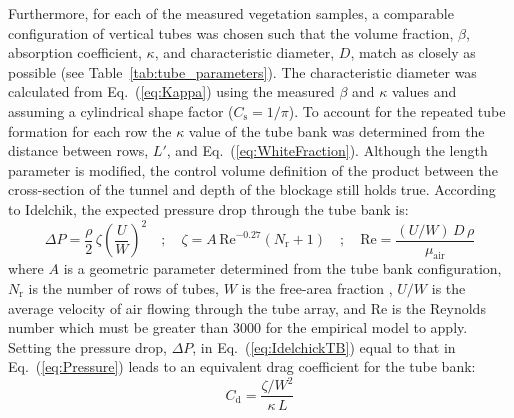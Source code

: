 \documentclass[12pt]{article}
\begin{document}
Furthermore, for each of the measured vegetation samples, a comparable configuration of vertical tubes was chosen such that the volume fraction, $\beta$, absorption coefficient, $\kappa$, and characteristic diameter, $D$, match as closely as possible (see Table~\ref{tab:tube_parameters}). The characteristic diameter was calculated from Eq.~(\ref{eq:Kappa}) using the measured $\beta$ and $\kappa$ values and assuming a cylindrical shape factor ($C_{\mathrm{s}} = 1/\pi$). To account for the repeated tube formation for each row the $\kappa$ value of the tube bank was determined from the distance between rows, $L'$, and Eq.~(\ref{eq:WhiteFraction}). Although the length parameter is modified, the control volume definition of the product between the cross-section of the tunnel and depth of the blockage still holds true. According to Idelchik, the expected pressure drop through the tube bank is:
\begin{equation}
\label{eq:IdelchickTB}
\Delta P = \frac{\rho}{2}\, \zeta  \left( \frac{U}{W} \right)^2  \quad ; \quad \zeta = A \, \mathrm{Re}^{-0.27} (N_\mathrm{r}+1) \quad ; \quad  \mathrm{Re} = \frac{(U/W) \, D \, \rho}{\mu_\mathrm{air}}
\end{equation}
where $A$ is a geometric parameter determined from the tube bank configuration, $N_\mathrm{r}$ is the number of rows of tubes, $W$ is the free-area fraction , $U/W$ is the average velocity of air flowing through the tube array, and Re is the Reynolds number which must be greater than 3000 for the empirical model to apply. Setting the pressure drop, $\Delta P$, in Eq.~(\ref{eq:IdelchickTB}) equal to that in Eq.~(\ref{eq:Pressure}) leads to an equivalent drag coefficient for the tube bank:
\begin{equation}
   C_\mathrm{d} = \frac{\zeta/W^2}{\kappa \, L}
\end{equation}
\end{document}
